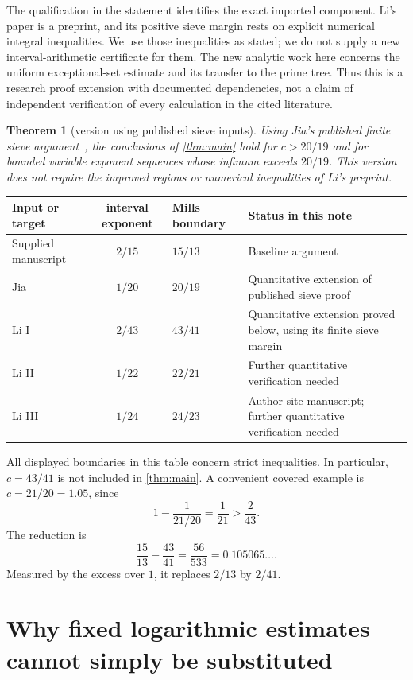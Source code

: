 \documentclass[11pt,a4paper]{article}
\newtheorem{theorem}{Theorem}[section]
\theoremstyle{remark}
\begin{document}
The qualification in the statement identifies the exact imported
component. Li's paper is a preprint, and its positive sieve margin rests
on explicit numerical integral inequalities. We use those inequalities
as stated; we do not supply a new interval-arithmetic certificate for
them. The new analytic work here concerns the uniform exceptional-set
estimate and its transfer to the prime tree. Thus this is a research
proof extension with documented dependencies, not a claim of independent
verification of every calculation in the cited literature.

\begin{theorem}[version using published sieve inputs]\label{thm:jia}
Using Jia's published finite sieve argument~\cite{Jia}, the conclusions
of \cref{thm:main} hold for $c>20/19$ and for bounded variable exponent
sequences whose infimum exceeds $20/19$.
This version does not require the improved regions or numerical
inequalities of Li's preprint.
\end{theorem}

\begin{center}
\small
\begin{tabularx}{\linewidth}{@{}lclX@{}}
\toprule
Input or target & interval exponent & Mills boundary & Status in this note\\
\midrule
Supplied manuscript & $2/15$ & $15/13$ & Baseline argument\\
Jia~\cite{Jia} & $1/20$ & $20/19$ & Quantitative extension of published sieve proof\\
Li I~\cite{LiI} & $2/43$ & $43/41$ & Quantitative extension proved below, using its finite sieve margin\\
Li II~\cite{LiII} & $1/22$ & $22/21$ & Further quantitative verification needed\\
Li III~\cite{LiIII} & $1/24$ & $24/23$ & Author-site manuscript; further quantitative verification needed\\
\bottomrule
\end{tabularx}
\end{center}

All displayed boundaries in this table concern strict inequalities.
In particular, $c=43/41$ is not included in \cref{thm:main}.
A convenient covered example is $c=21/20=1.05$, since
\[
 1-\frac1{21/20}=\frac1{21}>\frac2{43}.
\]
The reduction is
\[
 \frac{15}{13}-\frac{43}{41}=\frac{56}{533}=0.105065\ldots.
\]
Measured by the excess over $1$, it replaces $2/13$ by $2/41$.

\section{Why fixed logarithmic estimates cannot simply be substituted}
\end{document}
